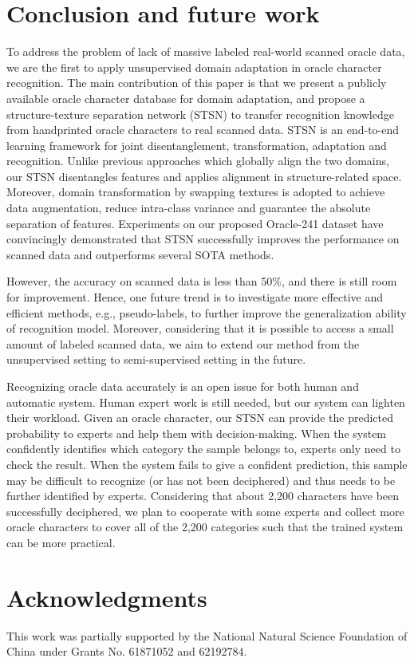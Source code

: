 \documentclass[10pt,journal,compsoc,twocolumn ]{IEEEtran}
\begin{document}
\section{Conclusion and future work}

To address the problem of lack of massive labeled real-world scanned oracle data, we are the first to apply unsupervised domain adaptation in oracle character recognition. The main contribution of this paper is that we present a publicly available oracle character database for domain adaptation, and propose a structure-texture separation network (STSN) to transfer recognition knowledge from handprinted oracle characters to real scanned data. STSN is an end-to-end learning framework for joint disentanglement, transformation, adaptation and recognition. Unlike previous approaches which globally align the two domains, our STSN disentangles features and applies alignment in structure-related space. Moreover, domain transformation by swapping textures is adopted to achieve data augmentation, reduce intra-class variance and guarantee the absolute separation of features. %
Experiments on our proposed Oracle-241 dataset have convincingly demonstrated that STSN successfully improves the performance on scanned data and outperforms several SOTA methods. %

However, the accuracy on scanned data is less than 50\%, and there is still room for improvement. Hence, one future trend is to investigate more effective and efficient methods, e.g., pseudo-labels, to further improve the generalization ability of recognition model. Moreover, considering that it is possible to access a small amount of labeled scanned data, we aim to extend our method from the unsupervised setting to semi-supervised setting in the future.

Recognizing oracle data accurately is an open issue for both human and automatic system. Human expert work is still needed, but our system can lighten their workload. Given an oracle character, our STSN can provide the predicted probability to experts and help them with decision-making. When the system confidently identifies which category the sample belongs to, experts only need to check the result. When the system fails to give a confident prediction, this sample may be difficult to recognize (or has not been deciphered) and thus needs to be further identified by experts. Considering that about 2,200 characters have been successfully deciphered, we plan to cooperate with some experts and collect more oracle characters to cover all of the 2,200 categories such that the trained system can be more practical. %

\section{Acknowledgments}

This work was partially supported by the National Natural Science Foundation of China under Grants No. 61871052 and 62192784.


{


}
\end{document}
